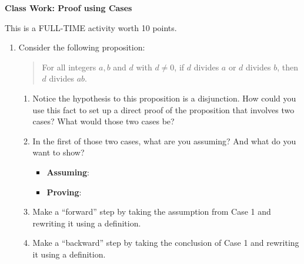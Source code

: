 \documentclass[11pt]{article}
\begin{document}
	
	\thispagestyle{empty}
	\renewcommand{\headrulewidth}{0.0pt}
	\thispagestyle{fancy}
	\lfoot{}
	\cfoot{}
	\rfoot{}	
	
	\vspace*{0in}

		\begin{center}
			\begin{large}
			\textbf{Class Work: Proof using Cases} \\
			\end{large}
		\end{center}
		
This is a FULL-TIME activity worth 10 points. \\


\begin{enumerate}
	\item Consider the following proposition: 
	\begin{quote}
		For all integers $a,b$ and $d$ with $d \neq 0$, if $d$ divides $a$ or $d$ divides $b$, then $d$ divides $ab$. 
	\end{quote}
	\begin{enumerate}
		\item Notice the hypothesis to this proposition is a disjunction. How could you use this fact to set up a direct proof of the proposition that involves two cases? What would those two cases be? 
		
		\vspace{0.7in}
		
		\item In the first of those two cases, what are you assuming? And what do you want to show? 
		
		\begin{itemize}
			\item \textbf{Assuming}: 
			\item \textbf{Proving}: 
		\end{itemize}
		
		\item Make a ``forward'' step by taking the assumption from Case 1 and rewriting it using a definition. 
		
		\vspace{0.7in}
		
		\item Make a ``backward'' step by taking the conclusion of Case 1 and rewriting it using a definition. 
		
		\vspace{0.7in}
		

\end{enumerate}
\end{enumerate}
\end{document}

